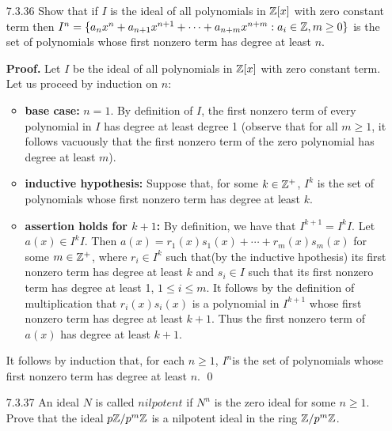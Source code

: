 \begin{enumerate}
\begin{enumerate}
               Conclude that $I \cap (J + K) = J + (I \cap K)$. \qed
      \end{enumerate}
   \item[7.3.36]  Show that if $I$ is the ideal of all polynomials in $\mathbb{Z}[x]$
                  with zero constant term then $I^n = \{a_nx^n + a_{n+1}x^{n+1} 
                  + \cdots + a_{n+m}x^{n+m} : a_i \in \mathbb{Z}, m \ge 0\}$ is the set
                  of polynomials whose first nonzero term has degree at least
                  $n$.

      \textbf{Proof.} Let $I$ be the ideal of all polynomials in $\mathbb{Z}[x]$ with 
      zero constant term. Let us proceed by induction on $n$:

      \begin{itemize}
         \item \textbf{base case:} $n = 1$. By definition of $I$, the first 
               nonzero term of every polynomial in $I$ has degree at least 
               degree 1 (observe that for all $m \ge 1$, it follows vacuously 
               that the first nonzero term of the zero polynomial has degree at 
               least $m$).

         \item \textbf{inductive hypothesis:} Suppose that, for some
               $k \in \mathbb{Z}^+$, $I^k$ is the set of polynomials whose first nonzero 
               term has degree at least $k$.
         \item \textbf{assertion holds for $k+1$:} By definition, we have that
               $I^{k+1} = I^kI$. Let $a(x) \in I^kI$. Then
               $a(x) = r_1(x)s_1(x) + \cdots + r_m(x)s_m(x)$ for some
               $m \in \mathbb{Z}^+$, where $r_i \in I^k$ such that(by the inductive
               hpothesis) its first nonzero term has degree at least $k$ and 
               $s_i \in I$ such that its first nonzero term has degree at least 
               1, $1\le i \le m$. It follows by the definition of multiplication 
               that $r_i(x)s_i(x)$ is a polynomial in $I^{k+1}$ whose first
               nonzero term has degree at least $k + 1$. Thus the first nonzero
               term of $a(x)$ has degree at least $k + 1$.            
      \end{itemize}
      It follows by induction that, for each $n \ge 1$, $I^n$is the set of
      polynomials whose first nonzero term has degree at least $n$. \qed
   \item[7.3.37]  An ideal $N$ is called $\textit{nilpotent}$ if $N^n$ is the
                  zero ideal for some $n \ge 1$. Prove that the ideal
                  $p\mathbb{Z}/p^m\mathbb{Z}$ is a nilpotent ideal in the ring $\mathbb{Z}/p^m\mathbb{Z}$.


\end{enumerate}
